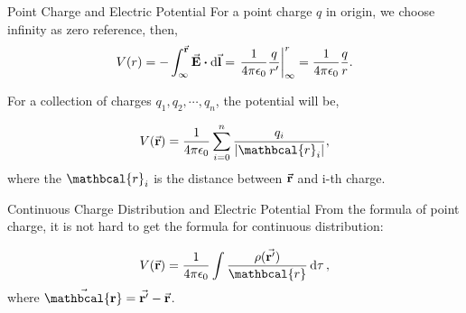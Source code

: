 \documentclass{beamer}
\begin{document}
\begin{frame}{Point Charge and Electric Potential}
    For a point charge $q$ in origin, we choose infinity as zero reference, then,
    \begin{equation}
        V(r) = -\int_{\infty}^{\va{r}} \va{E} \vdot \dd{\va{l}} = \eval{\frac{1}{4 \pi \epsilon_0} \frac{q}{r'}}_{\infty}^r = \frac{1}{4 \pi \epsilon_0} \frac{q}{r}.
    \end{equation}

    For a collection of charges $q_1, q_2, \cdots, q_n$, the potential will be,

    \begin{equation}
        V(\va{r}) = \frac{1}{4 \pi \epsilon_0} \sum_{i = 0}^{n} \frac{q_i}{\abs{\mathbcal{r}_i}},
    \end{equation}
    where the $\mathbcal{r}_i$ is the distance between $\va{r}$ and i-th charge.

\end{frame}

\begin{frame}{Continuous Charge Distribution and Electric Potential}
    From the formula of point charge, it is not hard to get the formula for continuous distribution:

    \begin{equation}
        V(\va{r}) = \frac{1}{4 \pi \epsilon_0} \int \frac{\rho(\va{r'})}{\mathbcal{r}} \dd{\tau},
    \end{equation}
    where $\va{\mathbcal{r}} = \va{r'} - \va{r}$.

\end{frame}
\end{document}
